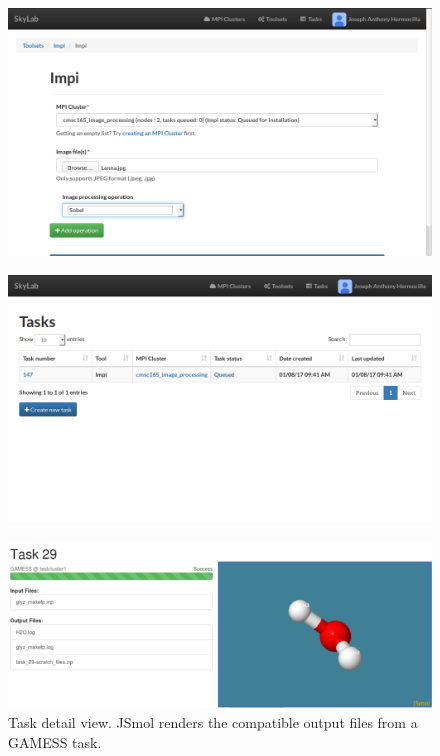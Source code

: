 \begin{figure}			
	\includegraphics[scale=0.93]{./images/n_impi_parameters_printed.png}
\end{figure}	
		
\begin{figure}			
	\includegraphics[scale=0.93]{./images/n_tasks_printed.png}			
\end{figure}	

\begin{figure}			
	\includegraphics[scale=0.35]{./images/jsmol_detail_view_2.png}			
	\caption{\label{fig:jsmol}Task detail view.  JSmol \cite{IJCH:IJCH201300024} renders the compatible output files from a GAMESS task.}			
\end{figure}	
	
